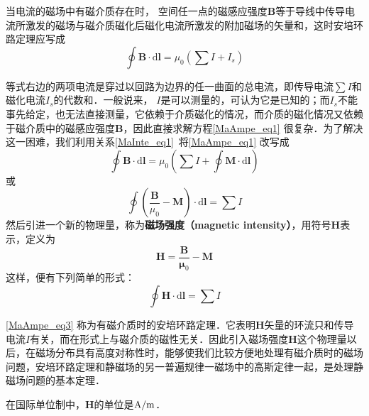 

当电流的磁场中有磁介质存在时， 空间任一点的磁感应强度$\mathbf B $等于导线中传导电流所激发的磁场与磁介质磁化后磁化电流所激发的附加磁场的矢量和，这时安培环路定理应写成
\begin{equation} \label{MaAmpe_eq1}
\oint \mathbf{B} \cdot \mathrm{d} \mathbf{l}=\mu_{0}\left(\sum I+I_{s}\right)
\end{equation}

等式右边的两项电流是穿过以回路为边界的任一曲面的总电流，即传导电流$\sum I$和磁化电流$I_s$的代数和．一般说来， $I $是可以测量的，可认为它是已知的；而$I_s$不能事先给定，也无法直接测量，它依赖于介质磁化的情况，而介质的磁化情况又依赖于磁介质中的磁感应强度$\mathbf B$，因此直接求解方程\autoref{MaAmpe_eq1} 很复杂．为了解决这一困难，我们利用关系\autoref{MaInte_eq1}~将\autoref{MaAmpe_eq1} 改写成
\begin{equation}
\oint \mathbf{B} \cdot \mathrm{d} \mathbf{l}=\mu_{0}\left(\sum I+\oint \mathbf{M} \cdot \mathrm{d} \mathbf{l}\right)
\end{equation}
或
\begin{equation} 
\oint\left(\frac{\mathbf{B}}{\mu_{0}}-\mathbf{M}\right) \cdot \mathrm{d} \mathbf{l}=\sum I
\end{equation}
然后引进一个新的物理量，称为\textbf{磁场强度（magnetic intensity）}，用符号$\mathbf H$表示，定义为
\begin{equation} \label{MaAmpe_eq2}
\mathbf{H}=\frac{\mathbf{B}}{\mathbf{\mu}_{0}}-\mathbf{M}
\end{equation}
这样，便有下列简单的形式： 
\begin{equation} \label{MaAmpe_eq3}
\oint \mathbf{H} \cdot \mathrm{d} \mathbf{l}=\sum I
\end{equation}

\autoref{MaAmpe_eq3} 称为有磁介质时的安培环路定理．它表明$\mathbf H $矢量的环流只和传导电流$I $有关，而在形式上与磁介质的磁性无关．因此引入磁场强度$\mathbf H $这个物理量以后，在磁场分布具有高度对称性时，能够使我们比较方便地处理有磁介质时的磁场问题，安培环路定理和静磁场的另一普遍规律一磁场中的高斯定律一起，是处理静磁场问题的基本定理．

在国际单位制中，$\mathbf  H $的单位是$\rm A/m$．


